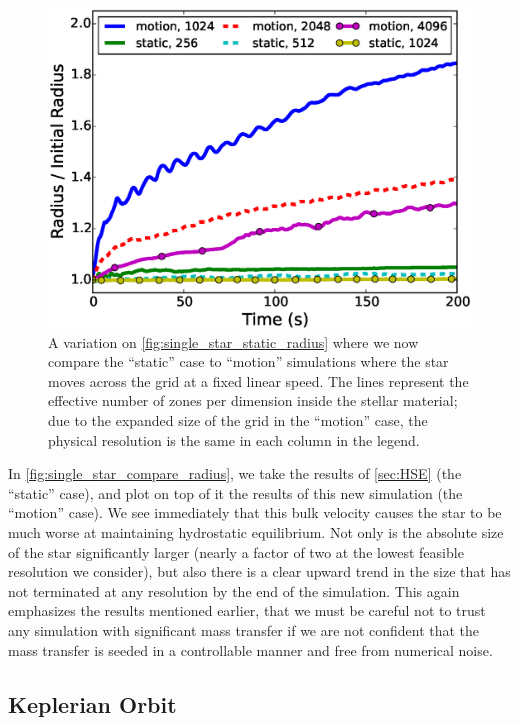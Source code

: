 \documentclass[iop,numberedappendix]{../emulateapj}
\begin{document}
\begin{figure}
  \centering
  \includegraphics[scale=0.45]{plots/single_star_compare_1e3_radius}
  \caption{A variation on \autoref{fig:single_star_static_radius} where
    we now compare the ``static'' case to ``motion'' simulations where the 
    star moves across the grid at a fixed linear speed. The lines represent 
    the effective number of zones per dimension inside the stellar material;
    due to the expanded size of the grid in the ``motion'' case, the 
    physical resolution is the same in each column in the legend.
    \label{fig:single_star_compare_radius}}
\end{figure}

In \autoref{fig:single_star_compare_radius}, we take the results of
\autoref{sec:HSE} (the ``static'' case), and plot on top of it the
results of this new simulation (the ``motion'' case). We see
immediately that this bulk velocity causes the star to be much worse
at maintaining hydrostatic equilibrium. Not only is the absolute size
of the star significantly larger (nearly a factor of two at the lowest
feasible resolution we consider), but also there is a clear upward
trend in the size that has not terminated at any resolution by the end
of the simulation.  This again emphasizes the results mentioned
earlier, that we must be careful not to trust any simulation with
significant mass transfer if we are not confident that the mass
transfer is seeded in a controllable manner and free from numerical
noise.

\subsection{Keplerian Orbit}\label{sec:kepler}
\end{document}
